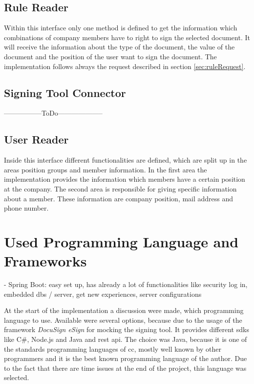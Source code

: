 \subsection*{Rule Reader}
Within this interface only one method is defined to get the information which combinations of company members have to right to sign the selected document. It will receive the information about the type of the document, the value of the document and the position of the user want to sign the document. The implementation follows always the request described in section \ref{sec:ruleRequest}.

\subsection*{Signing Tool Connector}
-----------------ToDo--------------------

\subsection*{User Reader}
Inside this interface different functionalities are defined, which are split up in the areas position groups and member information. In the first area the implementation provides the information which members have a certain position at the company. The second
area is responsible for giving specific information about a member. These information are company position, mail address and phone number.

\section{Used Programming Language and Frameworks}
- Spring Boot: easy set up, has already a lot of functionalities like security log in, embedded dbs / server, get new experiences, server configurations

At the start of the implementation a discussion were made, which programming language to use. Available were several options, because due to the usage of the framework \textit{DocuSign eSign} for mocking the signing tool. It provides different \glspl{sdk} like C\#, Node.js and Java \parencite{docusign2018sdk} and \gls{rest} \gls{api}. The choice was Java, because it is one of the standards programming languages of \gls{cc}, mostly well known by other programmers and it is the best known programming language of the author. Due to the fact that there are time issues at the end of the project, this language was selected.

